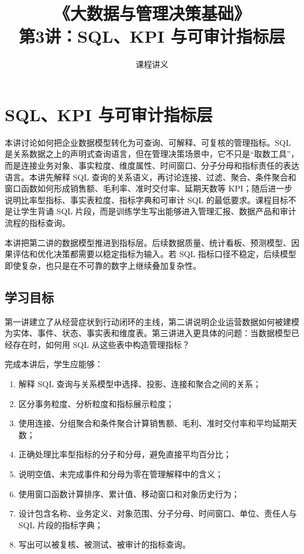 \documentclass[UTF8,fontset=fandol,openany,zihao=-4]{ctexbook}
\title{《大数据与管理决策基础》\\[0.5em]\large 第3讲：SQL、KPI 与可审计指标层}
\author{课程讲义}
\date{}
\begin{document}
\maketitle
\tableofcontents

\setcounter{chapter}{2}
\chapter{SQL、KPI 与可审计指标层}
\label{ch:week03-sql-kpi}

\begin{chapterbox}
本讲讨论如何把企业数据模型转化为可查询、可解释、可复核的管理指标。SQL 是关系数据之上的声明式查询语言，但在管理决策场景中，它不只是“取数工具”，而是连接业务对象、事实粒度、维度属性、时间窗口、分子分母和指标责任的表达语言。本讲先解释 SQL 查询的关系语义，再讨论连接、过滤、聚合、条件聚合和窗口函数如何形成销售额、毛利率、准时交付率、延期天数等 KPI；随后进一步说明比率型指标、事实表粒度、指标字典和可审计 SQL 的最低要求。课程目标不是让学生背诵 SQL 片段，而是训练学生写出能够进入管理汇报、数据产品和审计流程的指标查询。
\end{chapterbox}

\begin{modernbox}[课程接口]
本讲把第二讲的数据模型推进到指标层。后续数据质量、统计看板、预测模型、因果评估和优化决策都需要以稳定指标为输入。若 SQL 指标口径不稳定，后续模型即使复杂，也只是在不可靠的数字上继续叠加复杂性。
\end{modernbox}

\section{学习目标}

第一讲建立了从经营症状到行动闭环的主线，第二讲说明企业运营数据如何被建模为实体、事件、状态、事实表和维度表。第三讲进入更具体的问题：当数据模型已经存在时，如何用 SQL 从这些表中构造管理指标？

完成本讲后，学生应能够：
\begin{enumerate}
  \item 解释 SQL 查询与关系模型中选择、投影、连接和聚合之间的关系；
  \item 区分事务粒度、分析粒度和指标展示粒度；
  \item 使用连接、分组聚合和条件聚合计算销售额、毛利、准时交付率和平均延期天数；
  \item 正确处理比率型指标的分子和分母，避免直接平均百分比；
  \item 说明空值、未完成事件和分母为零在管理解释中的含义；
  \item 使用窗口函数计算排序、累计值、移动窗口和对象历史行为；
  \item 设计包含名称、业务定义、对象范围、分子分母、时间窗口、单位、责任人与 SQL 片段的指标字典；
  \item 写出可以被复核、被测试、被审计的指标查询。
\end{enumerate}
\end{document}
